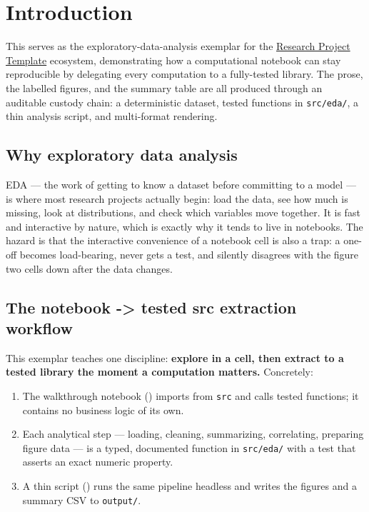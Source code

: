 \documentclass[
  english,
]{article}
\providecommand{\tightlist}{%
  \setlength{\itemsep}{0pt}\setlength{\parskip}{0pt}}
\begin{document}
\newpage

\section{Introduction}\label{sec:introduction}

This  serves as the
exploratory-data-analysis exemplar for the
\href{https://github.com/docxology/template}{Research Project Template}
ecosystem, demonstrating how a computational notebook can stay
reproducible by delegating every computation to a fully-tested library.
The prose, the labelled figures, and the summary table are all produced
through an auditable custody chain: a deterministic dataset, tested
functions in \texttt{src/eda/}, a thin analysis script, and multi-format
rendering.

\subsection{Why exploratory data
analysis}\label{why-exploratory-data-analysis}

EDA --- the work of getting to know a dataset before committing to a
model --- is where most research projects actually begin: load the data,
see how much is missing, look at distributions, and check which
variables move together. It is fast and interactive by nature, which is
exactly why it tends to live in notebooks. The hazard is that the
interactive convenience of a notebook cell is also a trap: a one-off
 becomes load-bearing, never gets a test,
and silently disagrees with the figure two cells down after the data
changes.

\subsection{The notebook -\textgreater{} tested src extraction
workflow}\label{the-notebook---tested-src-extraction-workflow}

This exemplar teaches one discipline: \textbf{explore in a cell, then
extract to a tested library the moment a computation matters.}
Concretely:

\begin{enumerate}
\def\labelenumi{\arabic{enumi}.}
\tightlist
\item
  The walkthrough notebook ()
  imports from \texttt{src} and calls tested functions; it contains no
  business logic of its own.
\item
  Each analytical step --- loading, cleaning, summarizing, correlating,
  preparing figure data --- is a typed, documented function in
  \texttt{src/eda/} with a test that asserts an exact numeric property.
\item
  A thin script () runs the same
  pipeline headless and writes the figures and a summary CSV to
  \texttt{output/}.
\end{enumerate}
\end{document}

